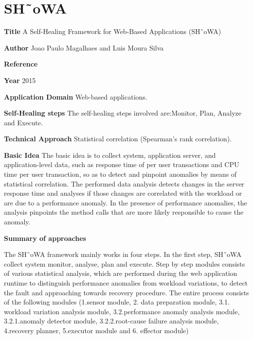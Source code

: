\section{SH˜oWA} \label{ap:Showa}
\begin{compactitem}
\item[\textbf{Title}]A Self-Healing Framework for Web-Based Applications (SH˜oWA)

\item[\textbf{Author}]Joao Paulo Magalhaes and Luis Moura Silva

\item[\textbf{Reference}]

\cite{magalhaes_showa:_2015}

\item[\textbf{Year}] 2015

\item[\textbf{Application Domain}]
Web-based applications. 

\item[\textbf{Self-Healing steps}] 
The self-healing steps involved are:Monitor, Plan, Analyze and Execute.

\item[\textbf{Technical Approach}] Statistical correlation (Spearman's rank correlation). 

\item[\textbf{Basic Idea}] 
The basic idea is to collect system, application server,
and application-level data, such as response time of per user transactions and CPU time per user transaction, so as to detect and pinpoint anomalies by means of statistical correlation. The performed data analysis detects changes in the server response time and analyses if those changes are correlated with the workload or are due to a performance anomaly. In the presence of performance anomalies, the analysis pinpoints the method calls that are more likely responsible to cause the anomaly.

\item[\textbf{Summary of approaches}] 

The SH˜oWA framework mainly works in four steps. In the first step, SH˜oWA collect system monitor, analyse, plan and execute. Step by step modules consists of various statistical analysis, which are performed during the web application runtime to distinguish performance anomalies from workload variations, to detect the fault and approaching towards recovery procedure. The entire process consists of the following modules (1.sensor module, 2. data preparation module, 3.1. workload variation analysis module, 3.2.performance anomaly analysis module, 3.2.1.anomaly detector module, 3.2.2.root-cause failure analysis module, 4.recovery planner, 5.executor module and 6. effector module)


\end{compactitem}

